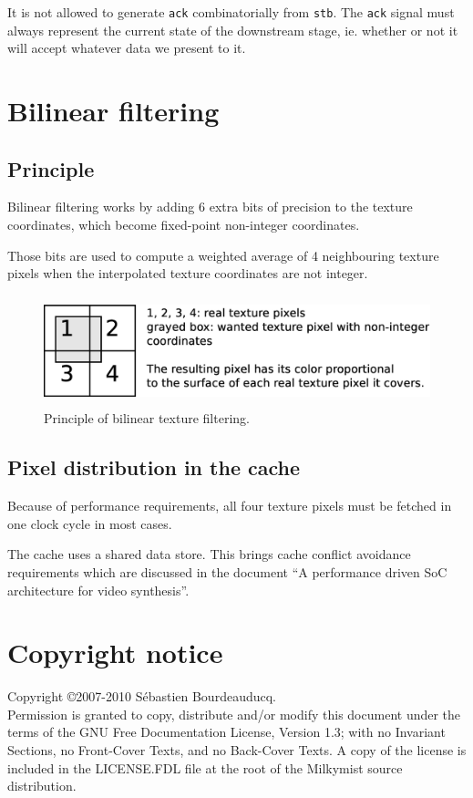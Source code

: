 \documentclass[a4paper,11pt]{article}
\begin{document}
It is not allowed to generate \verb!ack! combinatorially from \verb!stb!. The \verb!ack! signal must always represent the current state of the downstream stage, ie. whether or not it will accept whatever data we present to it.

\section{Bilinear filtering}
\subsection{Principle}
Bilinear filtering works by adding 6 extra bits of precision to the texture coordinates, which become fixed-point non-integer coordinates.

Those bits are used to compute a weighted average of 4 neighbouring texture pixels when the interpolated texture coordinates are not integer.

\begin{figure}[H]
\centering
\includegraphics[height=32mm]{bilinear.eps}
\caption{Principle of bilinear texture filtering.}\label{fig:bilinear}
\end{figure}

\subsection{Pixel distribution in the cache}
Because of performance requirements, all four texture pixels must be fetched in one clock cycle in most cases.

The cache uses a shared data store. This brings cache conflict avoidance requirements which are discussed in the document ``A performance driven SoC architecture for video synthesis''.

\section*{Copyright notice}
Copyright \copyright 2007-2010 S\'ebastien Bourdeauducq. \\
Permission is granted to copy, distribute and/or modify this document under the terms of the GNU Free Documentation License, Version 1.3; with no Invariant Sections, no Front-Cover Texts, and no Back-Cover Texts. A copy of the license is included in the LICENSE.FDL file at the root of the Milkymist source distribution.
\end{document}
